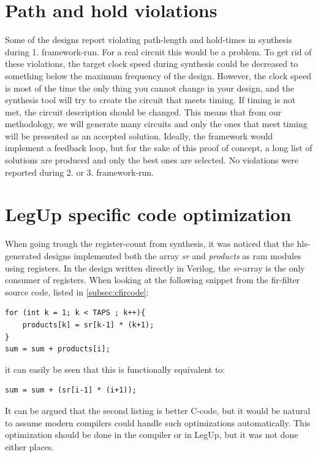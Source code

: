 \section{\label{sec:pathholdviolations}Path and hold violations}
Some of the designs report violating path-length and hold-times in synthesis during 1. framework-run. For a real circuit this would be a problem. To get rid of these violations, the target clock speed during synthesis could be decreased to something below the maximum frequency of the design. However, the clock speed is most of the time the only thing you cannot change in your design, and the synthesis tool will try to create the circuit that meets timing. If timing is not met, the circuit description should be changed. This means that from our methodology, we will generate many circuits and only the ones that meet timing will be presented as an accepted solution. Ideally, the framework would implement a feedback loop, but for the sake of this proof of concept, a long list of solutions are produced and only the best ones are selected. No violations were reported during 2. or 3. framework-run.

\section{\label{sec:codeoptimization}LegUp specific code optimization}

When going trough the register-count from synthesis, it was noticed that the \gls{hls}-generated designs implemented both the array \textit{sr} and \textit{products} as \gls{ram} modules using registers. In the design written directly in Verilog, the \textit{sr}-array is the only consumer of registers. When looking at the following snippet from the \gls{fir}-filter source code, listed in \cref{subsec:cfircode}:
\lstset{language=C,style=CStyle}
\begin{lstlisting}
for (int k = 1; k < TAPS ; k++){
    products[k] = sr[k-1] * (k+1);
}
sum = sum + products[i];
\end{lstlisting}
it can easily be seen that this is functionally equivalent to:
\begin{lstlisting}
sum = sum + (sr[i-1] * (i+1));
\end{lstlisting}
It can be argued that the second listing is better C-code, but it would be natural to assume modern compilers could handle such optimizations automatically. This optimization should be done in the compiler or in LegUp, but it was not done either places.

